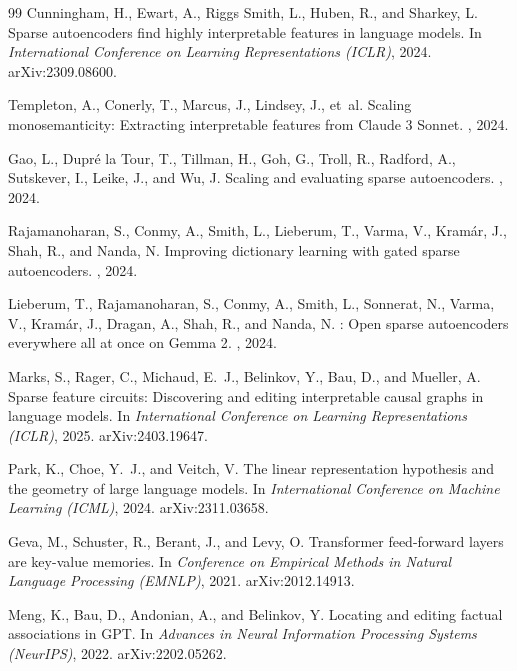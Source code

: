 \documentclass[11pt]{article}
\begin{document}
\begin{thebibliography}{99}
Cunningham, H., Ewart, A., Riggs Smith, L., Huben, R., and Sharkey, L.
\newblock Sparse autoencoders find highly interpretable features in language
models.
\newblock In {\em International Conference on Learning Representations
(ICLR)}, 2024. arXiv:2309.08600.

Templeton, A., Conerly, T., Marcus, J., Lindsey, J., et~al.
\newblock Scaling monosemanticity: Extracting interpretable features from
{Claude 3 Sonnet}.
, 2024.

Gao, L., Dupr\'e la Tour, T., Tillman, H., Goh, G., Troll, R., Radford, A.,
Sutskever, I., Leike, J., and Wu, J.
\newblock Scaling and evaluating sparse autoencoders.
, 2024.

Rajamanoharan, S., Conmy, A., Smith, L., Lieberum, T., Varma, V., Kram\'ar, J.,
Shah, R., and Nanda, N.
\newblock Improving dictionary learning with gated sparse autoencoders.
, 2024.

Lieberum, T., Rajamanoharan, S., Conmy, A., Smith, L., Sonnerat, N., Varma, V.,
Kram\'ar, J., Dragan, A., Shah, R., and Nanda, N.
: Open sparse autoencoders everywhere all at once
on {Gemma 2}.
, 2024.

Marks, S., Rager, C., Michaud, E.~J., Belinkov, Y., Bau, D., and Mueller, A.
\newblock Sparse feature circuits: Discovering and editing interpretable
causal graphs in language models.
\newblock In {\em International Conference on Learning Representations
(ICLR)}, 2025. arXiv:2403.19647.

Park, K., Choe, Y.~J., and Veitch, V.
\newblock The linear representation hypothesis and the geometry of large
language models.
\newblock In {\em International Conference on Machine Learning (ICML)},
2024. arXiv:2311.03658.

Geva, M., Schuster, R., Berant, J., and Levy, O.
\newblock Transformer feed-forward layers are key-value memories.
\newblock In {\em Conference on Empirical Methods in Natural Language
Processing (EMNLP)}, 2021. arXiv:2012.14913.


Meng, K., Bau, D., Andonian, A., and Belinkov, Y.
\newblock Locating and editing factual associations in {GPT}.
\newblock In {\em Advances in Neural Information Processing Systems
(NeurIPS)}, 2022. arXiv:2202.05262.


\end{thebibliography}
\end{document}
